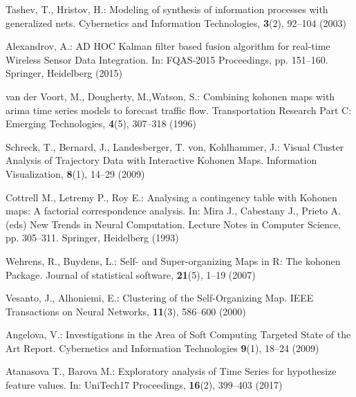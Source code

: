 \documentclass[runningheads]{llncs}
\begin{document}
\begin{thebibliography}{8}

Tashev, T., Hristov, H.: Modeling of synthesis of information processes with generalized nets. Cybernetics and Information Technologies, \textbf{3}(2), 92--104 (2003) 

Alexandrov, A.: AD HOC Kalman filter based fusion algorithm for real-time Wireless Sensor Data Integration. In: FQAS-2015 Proceedings, pp. 151--160. Springer, Heidelberg (2015)

van der Voort, M., Dougherty, M.,Watson, S.: Combining kohonen maps with arima time series models to forecast traffic flow. Transportation Research Part C: Emerging Technologies, \textbf{4}(5), 307--318 (1996) 

Schreck, T., Bernard, J., Landesberger, T. von, Kohlhammer, J.: Visual Cluster Analysis of Trajectory Data with Interactive Kohonen Maps. Information Visualization, \textbf{8}(1), 14--29 (2009)

Cottrell M., Letremy P., Roy E.: Analysing a contingency table with Kohonen maps: A factorial correspondence analysis. In: Mira J., Cabestany J., Prieto A. (eds) New Trends in Neural Computation. Lecture Notes in Computer Science, pp. 305--311. Springer, Heidelberg (1993)

Wehrens, R., Buydens, L.: Self- and Super-organizing Maps in R: The kohonen Package. Journal of statistical software, \textbf{21}(5), 1--19 (2007)

Vesanto, J., Alhoniemi, E.: Clustering of the Self-Organizing Map. IEEE Transactions on Neural Networks, \textbf{11}(3), 586--600 (2000) 

Angelova, V.: Investigations in the Area of Soft Computing Targeted State of the Art Report. Cybernetics and Information Technologies \textbf{9}(1), 18--24 (2009)

Atanasova T., Barova M.: Exploratory analysis of Time Series for hypothesize feature values. In: UniTech17 Proceedings,  \textbf{16}(2), 399--403 (2017)

\end{thebibliography}
\end{document}
